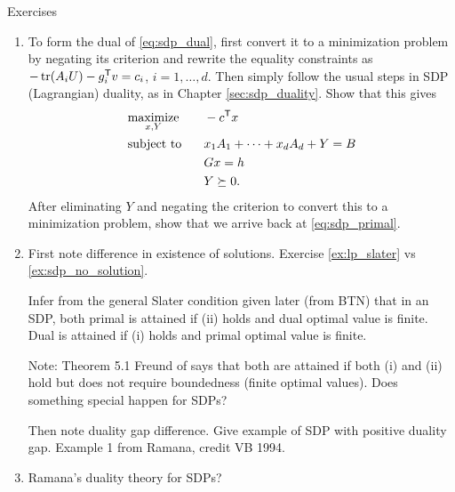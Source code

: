 \begin{xcb}{Exercises}
\begin{enumerate}[label=\thechapter.\arabic*]
\item \label{ex:sdp_dual_dual}
  To form the dual of \eqref{eq:sdp_dual}, first convert it to a minimization
  problem by negating its criterion and rewrite the equality constraints as
  $-\operatorname{tr}(A_iU) - g_i^{\mathsf{T}} v = c_i$, $i = 1,\dots,d$. Then simply follow the usual
  steps in SDP (Lagrangian) duality, as in Chapter \ref{sec:sdp_duality}. Show
  that this gives    
  \begin{alignat*}{2}
  &\operatorname*{maximize}_{x,Y} \quad && -c^{\mathsf{T}} x \\ 
  &\operatorname{subject\,\,to} && x_1 A_1 + \cdots + x_d A_d + Y = B \\
  & && Gx = h \\
  & && Y \succeq 0.
  \end{alignat*}
  After eliminating $Y$ and negating the criterion to convert this to a
  minimization problem, show that we arrive back at \eqref{eq:sdp_primal}.  

\item \label{ex:lp_sdp_differences}
  First note difference in existence of solutions. Exercise \ref{ex:lp_slater}
  vs \ref{ex:sdp_no_solution}. 

  Infer from the general Slater condition given later (from BTN) that in an SDP,
  both primal is attained if (ii) holds and dual optimal value is finite. Dual
  is attained if (i) holds and primal optimal value is finite. 

  Note: Theorem 5.1 Freund of says that both are attained if both (i) and (ii)
  hold but does not require boundedness (finite optimal values). Does something
  special happen for SDPs?  

  Then note duality gap difference. Give example of SDP with positive duality
  gap. Example 1 from Ramana, credit VB 1994.  

\item Ramana's duality theory for SDPs?
\end{enumerate}
\end{xcb}
